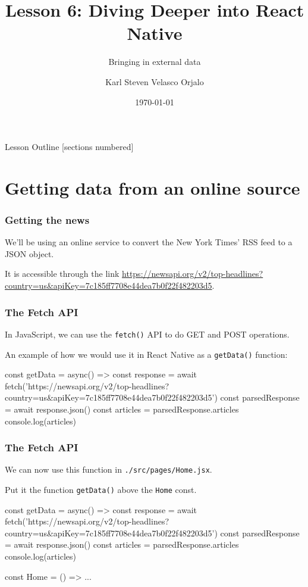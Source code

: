 \documentclass{beamer}
\title{Lesson 6: Diving Deeper into React Native}
\subtitle{Bringing in external data}
\date{\today}
\author{Karl Steven Velasco Orjalo}
\institute{React Native Quickstart}
\begin{document}
  \maketitle

  \begin{frame}{Lesson Outline}
    [sections numbered]
    \tableofcontents
  \end{frame}

  \section{Getting data from an online source}
  \begin{frame}[fragile]
    \frametitle{Getting the news}
    We'll be using an online service to convert the New York Times' RSS feed to a JSON object. 

    It is accessible through the link \url{https://newsapi.org/v2/top-headlines?country=us&apiKey=7c185ff7708e44dea7b0f22f482203d5}.
  \end{frame}
  \begin{frame}[fragile]
    \frametitle{The Fetch API}
    In JavaScript, we can use the \verb|fetch()| API to do GET and POST operations.

    An example of how we would use it in React Native as a \verb|getData()| function: 

    \begin{jscodesmall}
const getData = async() => {
  const response = await fetch('https://newsapi.org/v2/top-headlines?country=us&apiKey=7c185ff7708e44dea7b0f22f482203d5')
  const parsedResponse = await response.json()
  const articles = parsedResponse.articles
  console.log(articles)
}  
    \end{jscodesmall}
  \end{frame}
  \begin{frame}[fragile]
    \frametitle{The Fetch API}
    We can now use this function in \verb|./src/pages/Home.jsx|.

    Put it the function \verb|getData()| above the \verb|Home| const. 
    \begin{jscodesmall}
const getData = async() => {
  const response = await fetch('https://newsapi.org/v2/top-headlines?country=us&apiKey=7c185ff7708e44dea7b0f22f482203d5')
  const parsedResponse = await response.json()
  const articles = parsedResponse.articles
  console.log(articles)
}  

const Home = () => {
...
}
    \end{jscodesmall}
  \end{frame}
\end{document}
